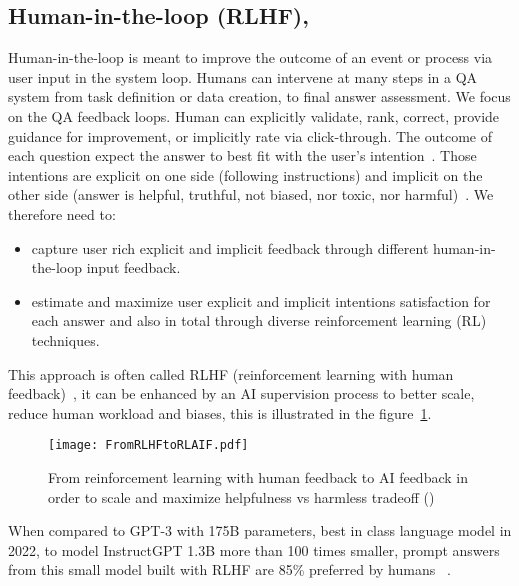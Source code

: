 \documentclass[acmsmall]{acmart}
\begin{document}
\subsection{Human-in-the-loop (RLHF), } \citep{wangPuttingHumansNatural2021}
Human-in-the-loop is meant to improve the outcome of an event or process via user input in the system loop. Humans can intervene at many steps in a QA system from task definition or data creation, to final answer assessment. We focus on the QA feedback loops. Human can explicitly validate, rank, correct, provide guidance for improvement, or implicitly rate via click-through. The outcome of each question expect the answer to best fit with the user’s intention~\citep{leikeScalableAgentAlignment2018}. Those intentions are explicit on one side (following instructions) and implicit on the other side (answer is helpful, truthful, not biased, nor toxic, nor harmful)~\citep{askellGeneralLanguageAssistant2021, baiTrainingHelpfulHarmless2022}.
We therefore need to:
\begin{itemize}
    \item capture user rich explicit and implicit feedback through different human-in-the-loop input feedback.
    \item estimate and maximize user explicit and implicit intentions satisfaction for each answer and also in total through diverse reinforcement learning (RL) techniques.
\end{itemize}
This approach is often called RLHF (reinforcement learning with human feedback)~\citep{ouyangTrainingLanguageModels2022, baiTrainingHelpfulHarmless2022, daniels-kochExpertiseProblemLearning2022, anonymousTaskAmbiguityHumans2022, ganguliRedTeamingLanguage2022, baiConstitutionalAIHarmlessness2022}, it can be enhanced by an AI supervision process to better scale, reduce human workload and biases, this is illustrated in the figure~\ref{RLHF CAI}.

\begin{figure}
\texttt{[image: FromRLHFtoRLAIF.pdf]}
\caption{From reinforcement learning with human feedback to AI feedback in order to scale and maximize helpfulness vs harmless tradeoff (\citet{ouyangTrainingLanguageModels2022, baiConstitutionalAIHarmlessness2022})}
\label{RLHF CAI}
\end{figure}

When compared to GPT-3 with 175B parameters, best in class language model in 2022, to model InstructGPT 1.3B more than 100 times smaller, prompt answers from this small model built with RLHF are 85\% preferred by humans~\citep{ouyangTrainingLanguageModels2022} .
\end{document}
